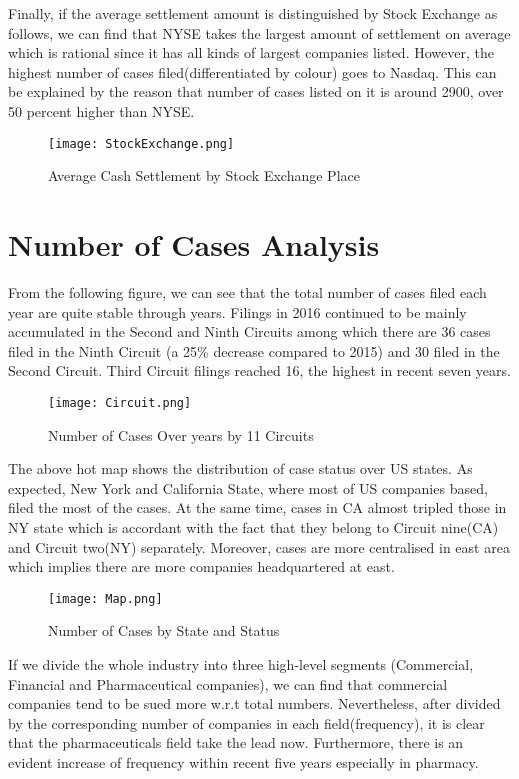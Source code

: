 \indent Finally, if the average settlement amount is distinguished by Stock Exchange as follows, we can find that NYSE takes the largest amount of settlement on average which is rational since it has all kinds of largest companies listed. However, the highest number of cases filed(differentiated by colour) goes to Nasdaq. This can be explained by the reason that number of cases listed on it is around 2900, over 50 percent higher than NYSE. 
\begin{figure}[H]
  \centering
  \texttt{[image: StockExchange.png]}
  \caption{Average Cash Settlement by Stock Exchange Place}
\end{figure}
\section{Number of Cases Analysis}
From the following figure, we can see that the total number of cases filed each year are quite stable through years. Filings in 2016 continued to be mainly accumulated in the Second and Ninth Circuits among which there are 36 cases filed in the Ninth Circuit (a 25\% decrease compared to 2015) and 30 filed in the Second Circuit. Third Circuit filings reached 16, the highest in recent seven years. 
\begin{figure}[H]
  \centering
  \texttt{[image: Circuit.png]}
  \caption{Number of Cases Over years by 11 Circuits}
\end{figure}
The above hot map shows the distribution of case status over US states. As expected, New York and California State, where most of US companies based, filed the most of the cases. At the same time, cases in CA almost tripled those in NY state which is accordant with the fact that they belong to Circuit nine(CA) and Circuit two(NY) separately. Moreover, cases are more centralised in east area which implies there are more companies headquartered at east.\\
\begin{figure}[H]
  \centering
  \texttt{[image: Map.png]}
  \caption{Number of Cases by State and Status}
\end{figure}
If we divide the whole industry into three high-level segments (Commercial, Financial and Pharmaceutical companies), we can find that commercial companies tend to be sued more w.r.t total numbers. Nevertheless, after divided by the corresponding number of companies in each field(frequency), it is clear that the pharmaceuticals field take the lead now. Furthermore, there is an evident increase of frequency within recent five years especially in pharmacy. 
